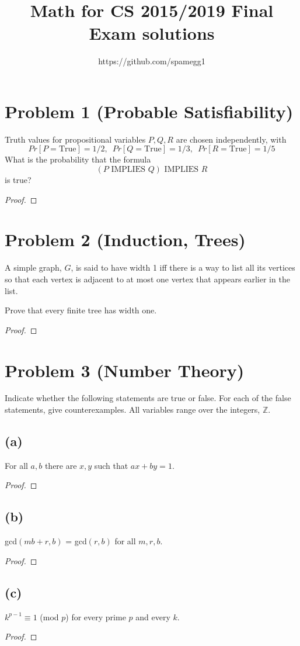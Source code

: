 \documentclass[14pt]{extarticle}
\title{Math for CS 2015/2019 Final Exam solutions}
\author{https://github.com/spamegg1}
\begin{document}
\maketitle
\tableofcontents

\section{Problem 1 (Probable Satisfiability)}
Truth values for propositional variables $P, Q, R$ are chosen independently, with
$$
Pr[P = \text{True}] = 1/2, \,\,\, Pr[Q = \text{True}] = 1/3, \,\,\, Pr[R = \text{True}] = 1/5
$$
What is the probability that the formula
$$
(P \text{ IMPLIES } Q) \text{ IMPLIES } R
$$
is true?
\begin{proof}
\end{proof}

\section{Problem 2 (Induction, Trees)}
A simple graph, $G$, is said to have width 1 iff there is a way to list all its vertices so that each vertex is adjacent to at most one vertex that appears earlier in the list.

Prove that every finite tree has width one.
\begin{proof}
\end{proof}

\section{Problem 3 (Number Theory)}
Indicate whether the following statements are true or false. For each of the false statements, give coun­terexamples. All variables range over the integers, $\mathbb{Z}$.
\subsection{(a)}
For all $a,b$ there are $x,y$ such that $ax + by = 1$.
\begin{proof}
\end{proof}

\subsection{(b)}
gcd$(mb+r, b)$ = gcd$(r,b)$ for all $m, r, b$.
\begin{proof}
\end{proof}

\subsection{(c)}
$k^{p-1} \equiv 1$ (mod $p$) for every prime $p$ and every $k$.
\begin{proof}
\end{proof}
\end{document}
